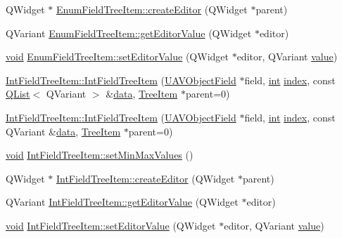 \begin{DoxyCompactItemize}
\item 
Q\-Widget $\ast$ \hyperlink{group___u_a_v_object_browser_plugin_ga44f6457ccf2e1741aef853d851162981}{Enum\-Field\-Tree\-Item\-::create\-Editor} (Q\-Widget $\ast$parent)
\item 
Q\-Variant \hyperlink{group___u_a_v_object_browser_plugin_ga90464609dbac318a21de05cc0b906c6d}{Enum\-Field\-Tree\-Item\-::get\-Editor\-Value} (Q\-Widget $\ast$editor)
\item 
\hyperlink{group___u_a_v_objects_plugin_ga444cf2ff3f0ecbe028adce838d373f5c}{void} \hyperlink{group___u_a_v_object_browser_plugin_gaf34de2505125e49c75e2f4623cdaa726}{Enum\-Field\-Tree\-Item\-::set\-Editor\-Value} (Q\-Widget $\ast$editor, Q\-Variant \hyperlink{glext_8h_aa0e2e9cea7f208d28acda0480144beb0}{value})
\item 
\hyperlink{group___u_a_v_object_browser_plugin_ga4ca34e25fd72802feaeb4123607bb7c4}{Int\-Field\-Tree\-Item\-::\-Int\-Field\-Tree\-Item} (\hyperlink{class_u_a_v_object_field}{U\-A\-V\-Object\-Field} $\ast$field, \hyperlink{ioapi_8h_a787fa3cf048117ba7123753c1e74fcd6}{int} \hyperlink{glext_8h_ab47dd9958bcadea08866b42bf358e95e}{index}, const \hyperlink{class_q_list}{Q\-List}$<$ Q\-Variant $>$ \&\hyperlink{glext_8h_a8850df0785e6fbcc2351af3b686b8c7a}{data}, \hyperlink{class_tree_item}{Tree\-Item} $\ast$parent=0)
\item 
\hyperlink{group___u_a_v_object_browser_plugin_gab944da4a69d80c272ecb2cd56cb68a21}{Int\-Field\-Tree\-Item\-::\-Int\-Field\-Tree\-Item} (\hyperlink{class_u_a_v_object_field}{U\-A\-V\-Object\-Field} $\ast$field, \hyperlink{ioapi_8h_a787fa3cf048117ba7123753c1e74fcd6}{int} \hyperlink{glext_8h_ab47dd9958bcadea08866b42bf358e95e}{index}, const Q\-Variant \&\hyperlink{glext_8h_a8850df0785e6fbcc2351af3b686b8c7a}{data}, \hyperlink{class_tree_item}{Tree\-Item} $\ast$parent=0)
\item 
\hyperlink{group___u_a_v_objects_plugin_ga444cf2ff3f0ecbe028adce838d373f5c}{void} \hyperlink{group___u_a_v_object_browser_plugin_ga04070de761838b1f1df2c69a3b0c4529}{Int\-Field\-Tree\-Item\-::set\-Min\-Max\-Values} ()
\item 
Q\-Widget $\ast$ \hyperlink{group___u_a_v_object_browser_plugin_ga1ce7bba5d398e5db5afb25a1fdecc2cd}{Int\-Field\-Tree\-Item\-::create\-Editor} (Q\-Widget $\ast$parent)
\item 
Q\-Variant \hyperlink{group___u_a_v_object_browser_plugin_ga1bfea485d5919a5c2548115597aa5644}{Int\-Field\-Tree\-Item\-::get\-Editor\-Value} (Q\-Widget $\ast$editor)
\item 
\hyperlink{group___u_a_v_objects_plugin_ga444cf2ff3f0ecbe028adce838d373f5c}{void} \hyperlink{group___u_a_v_object_browser_plugin_ga5c67d501056c61f098c9166f9e8bdef5}{Int\-Field\-Tree\-Item\-::set\-Editor\-Value} (Q\-Widget $\ast$editor, Q\-Variant \hyperlink{glext_8h_aa0e2e9cea7f208d28acda0480144beb0}{value})

\end{DoxyCompactItemize}
